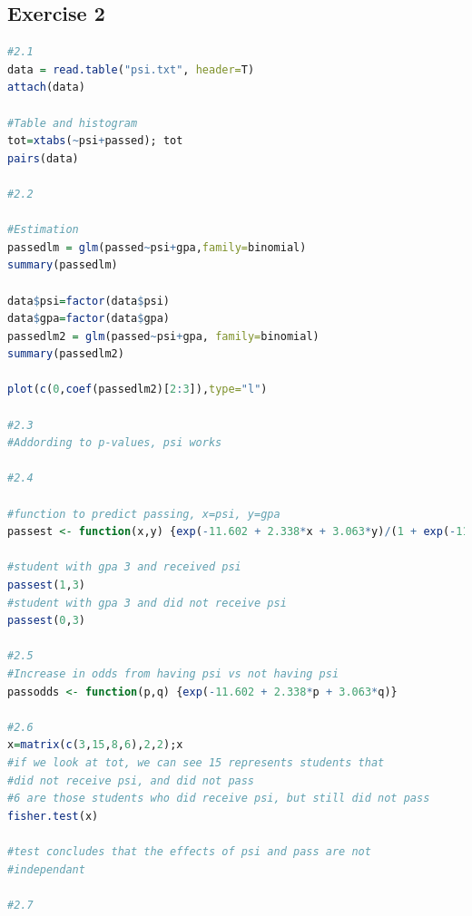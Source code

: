 \documentclass{article}
\begin{document}
    \subsection{Exercise 2}\label{sec:RE2}
      \begin{lstlisting}[language=R]
      #2.1
data = read.table("psi.txt", header=T)
attach(data)

#Table and histogram
tot=xtabs(~psi+passed); tot
pairs(data)

#2.2

#Estimation
passedlm = glm(passed~psi+gpa,family=binomial)
summary(passedlm)

data$psi=factor(data$psi)
data$gpa=factor(data$gpa)
passedlm2 = glm(passed~psi+gpa, family=binomial)
summary(passedlm2)

plot(c(0,coef(passedlm2)[2:3]),type="l")

#2.3
#Addording to p-values, psi works

#2.4

#function to predict passing, x=psi, y=gpa
passest <- function(x,y) {exp(-11.602 + 2.338*x + 3.063*y)/(1 + exp(-11.602 + 2.338*x + 3.063*y))}

#student with gpa 3 and received psi
passest(1,3)
#student with gpa 3 and did not receive psi
passest(0,3)

#2.5
#Increase in odds from having psi vs not having psi
passodds <- function(p,q) {exp(-11.602 + 2.338*p + 3.063*q)}

#2.6
x=matrix(c(3,15,8,6),2,2);x
#if we look at tot, we can see 15 represents students that
#did not receive psi, and did not pass
#6 are those students who did receive psi, but still did not pass
fisher.test(x)

#test concludes that the effects of psi and pass are not
#independant

#2.7

      \end{lstlisting}
\end{document}

